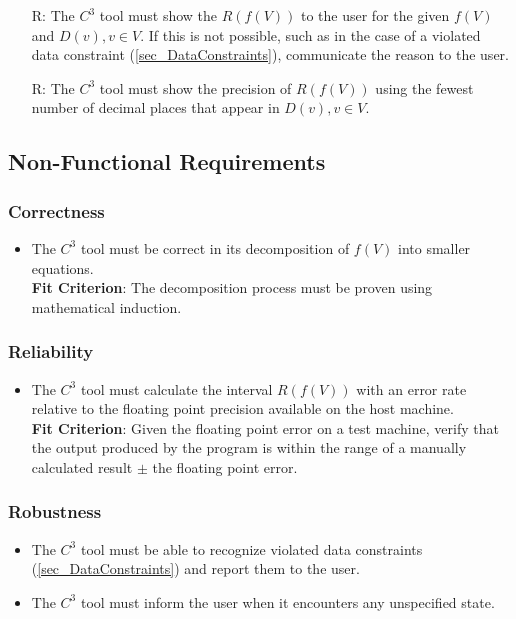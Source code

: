 \documentclass[12pt]{article}
\newcounter{reqnum} %
\newcommand{\prognameAbbrv}{$C^{3}$}
\begin{document}
\begin{itemize}
\item[R\refstepcounter{reqnum}\thereqnum \label{R_Output}:] The 
\prognameAbbrv{} tool must show the $R(f(V))$ to the user for the given $f(V)$ 
and $D(v), v \in V$. If this is not possible, such as in the case of a violated 
data constraint (\ref{sec_DataConstraints}), communicate the reason to the 
user.

\item[R\refstepcounter{reqnum}\thereqnum \label{R_SigFig}:] The 
\prognameAbbrv{} tool must show the precision of $R(f(V))$ using the fewest 
number of decimal places that appear in $D(v), v \in V$.

\end{itemize}

\subsection{Non-Functional Requirements}

\subsubsection*{Correctness}
\begin{itemize}
	\item The \prognameAbbrv{} tool must be correct in its decomposition of 
	$f(V)$ into smaller equations.\\ \textbf{Fit Criterion}: The decomposition 
	process must be proven using mathematical induction.
\end{itemize}

\subsubsection*{Reliability}
\begin{itemize}
	\item The \prognameAbbrv{} tool must calculate the interval $R(f(V))$ with 
	an error rate relative to the floating point precision available on the 
	host machine. \\ \textbf{Fit Criterion}: Given the floating point error on 
	a test machine, verify that the output produced by the program is within 
	the range of a manually calculated result $\pm$ the floating point error.
\end{itemize}

\subsubsection*{Robustness}
\begin{itemize}
	\item The \prognameAbbrv{} tool must be able to recognize violated data 
	constraints (\ref{sec_DataConstraints}) and report them to the user.
	\item The \prognameAbbrv{} tool must inform the user when it encounters any 
	unspecified state.
\end{itemize}
\end{document}
